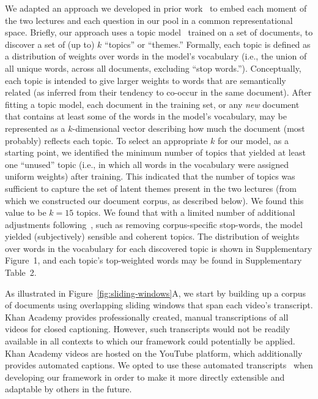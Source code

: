 \documentclass[10pt]{article}
\newcommand{\topics}{2}
\newcommand{\topicWordWeights}{1}
\begin{document}
We adapted an approach we developed in prior work~\citep{HeusEtal21} to embed
each moment of the two lectures and each question in our pool in a common
representational space. Briefly, our approach uses a topic model~\citep[Latent
Dirichlet Allocation; ][]{BleiEtal03} trained on a set of documents, to
discover a set of (up to) $k$ ``topics'' or ``themes.'' Formally, each topic is
defined as a distribution of weights over words in the model's vocabulary
(i.e., the union of all unique words, across all documents, excluding ``stop
words.''). Conceptually, each topic is intended to give larger weights to words
that are semantically related (as inferred from their tendency to co-occur in
the same document). After fitting a topic model, each document in the training
set, or any \textit{new} document that contains at least some of the words in
the model's vocabulary, may be represented as a $k$-dimensional vector
describing how much the document (most probably) reflects each topic. To select
an appropriate $k$ for our model, as a starting point, we identified the
minimum number of topics that yielded at least one ``unused'' topic (i.e., in
which all words in the vocabulary were assigned uniform weights) after
training. This indicated that the number of topics was sufficient to capture
the set of latent themes present in the two lectures (from which we constructed
our document corpus, as described below). We found this value to be $k = 15$
topics. We found that with a limited number of additional adjustments
following~\citep{BoydMimn14}, such as removing corpus-specific stop-words, the
model yielded (subjectively) sensible and coherent topics. The distribution of
weights over words in the vocabulary for each discovered topic is shown in
Supplementary Figure~\topicWordWeights, and each topic's top-weighted words may
be found in Supplementary Table~\topics.

As illustrated in Figure~\ref{fig:sliding-windows}A, we start by building up a
corpus of documents using overlapping sliding windows that span each video's
transcript. Khan Academy provides professionally created, manual transcriptions
of all videos for closed captioning. However, such transcripts would not be
readily available in all contexts to which our framework could potentially be
applied. Khan Academy videos are hosted on the YouTube platform, which
additionally provides automated captions. We opted to use these automated
transcripts~\citep[which, in prior work, we have found to be of sufficiently
near-human quality to yield reliable data in behavioral
studies; ][]{ZimaEtal18} when developing our framework in order to make
it more directly extensible and adaptable by others in the future.
\end{document}
